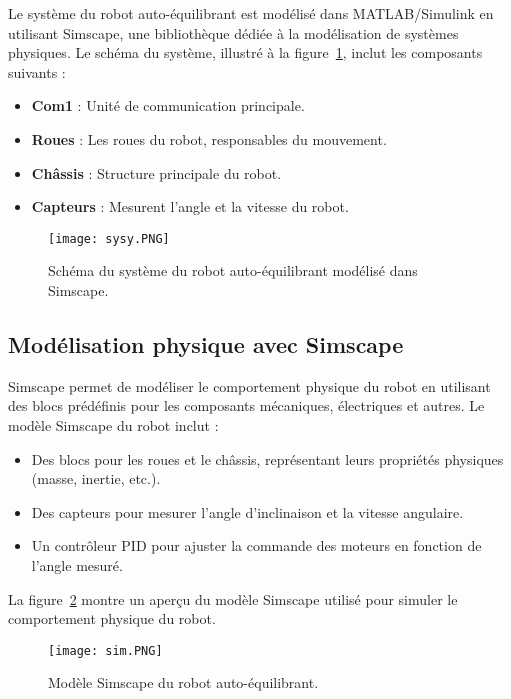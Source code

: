 \documentclass{report}
\begin{document}
Le système du robot auto-équilibrant est modélisé dans MATLAB/Simulink en utilisant Simscape, une bibliothèque dédiée à la modélisation de systèmes physiques. Le schéma du système, illustré à la figure~\ref{fig:shema_sys}, inclut les composants suivants :

\begin{itemize}
    \item \textbf{Com1} : Unité de communication principale.
    \item \textbf{Roues} : Les roues du robot, responsables du mouvement.
    \item \textbf{Châssis} : Structure principale du robot.
    \item \textbf{Capteurs} : Mesurent l'angle et la vitesse du robot.
\end{itemize}

\begin{figure}[h!]
    \centering
    \texttt{[image: sysy.PNG]}
    \caption{Schéma du système du robot auto-équilibrant modélisé dans Simscape.}
    \label{fig:shema_sys}
\end{figure}
\vspace{10cm}

\subsection{Modélisation physique avec Simscape}
\label{subsec:simscape}

Simscape permet de modéliser le comportement physique du robot en utilisant des blocs prédéfinis pour les composants mécaniques, électriques et autres. Le modèle Simscape du robot inclut :

\begin{itemize}
    \item Des blocs pour les roues et le châssis, représentant leurs propriétés physiques (masse, inertie, etc.).
    \item Des capteurs pour mesurer l'angle d'inclinaison et la vitesse angulaire.
    \item Un contrôleur PID pour ajuster la commande des moteurs en fonction de l'angle mesuré.
\end{itemize}

La figure~\ref{fig:sim_model} montre un aperçu du modèle Simscape utilisé pour simuler le comportement physique du robot.

\begin{figure}[h]
    \centering
    \texttt{[image: sim.PNG]}
    \caption{Modèle Simscape du robot auto-équilibrant.}
    \label{fig:sim_model}
\end{figure}
\vspace{5cm}
\end{document}
